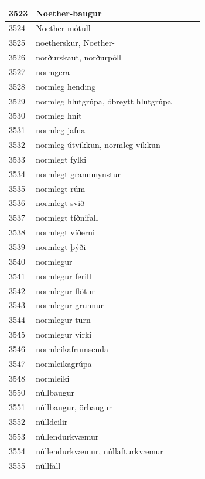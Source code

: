\begin{longtable}{p{}|p{}|p{}|p{}|p{}}
\hline
3523 & Noether-baugur &  &  &  \\
\hline
3524 & Noether-mótull &  &  &  \\
\hline
3525 & noetherskur, Noether- &  &  &  \\
\hline
3526 & norðurskaut, norðurpóll &  &  &  \\
\hline
3527 & normgera &  &  &  \\
\hline
3528 & normleg hending &  &  &  \\
\hline
3529 & normleg hlutgrúpa, óbreytt hlutgrúpa &  &  &  \\
\hline
3530 & normleg hnit &  &  &  \\
\hline
3531 & normleg jafna &  &  &  \\
\hline
3532 & normleg útvíkkun, normleg víkkun &  &  &  \\
\hline
3533 & normlegt fylki &  &  &  \\
\hline
3534 & normlegt grannmynstur &  &  &  \\
\hline
3535 & normlegt rúm &  &  &  \\
\hline
3536 & normlegt svið &  &  &  \\
\hline
3537 & normlegt tíðnifall &  &  &  \\
\hline
3538 & normlegt víðerni &  &  &  \\
\hline
3539 & normlegt þýði &  &  &  \\
\hline
3540 & normlegur &  &  &  \\
\hline
3541 & normlegur ferill &  &  &  \\
\hline
3542 & normlegur flötur &  &  &  \\
\hline
3543 & normlegur grunnur &  &  &  \\
\hline
3544 & normlegur turn &  &  &  \\
\hline
3545 & normlegur virki &  &  &  \\
\hline
3546 & normleikafrumsenda &  &  &  \\
\hline
3547 & normleikagrúpa &  &  &  \\
\hline
3548 & normleiki &  &  &  \\
\hline
3550 & núllbaugur &  &  &  \\
\hline
3551 & núllbaugur, örbaugur &  &  &  \\
\hline
3552 & núlldeilir &  &  &  \\
\hline
3553 & núllendurkvæmur &  &  &  \\
\hline
3554 & núllendurkvæmur, núllafturkvæmur &  &  &  \\
\hline
3555 & núllfall &  &  &  \\

\end{longtable}
